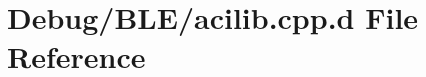 \hypertarget{_debug_2_b_l_e_2acilib_8cpp_8d}{\section{\-Debug/\-B\-L\-E/acilib.cpp.\-d \-File \-Reference}
\label{_debug_2_b_l_e_2acilib_8cpp_8d}
}
